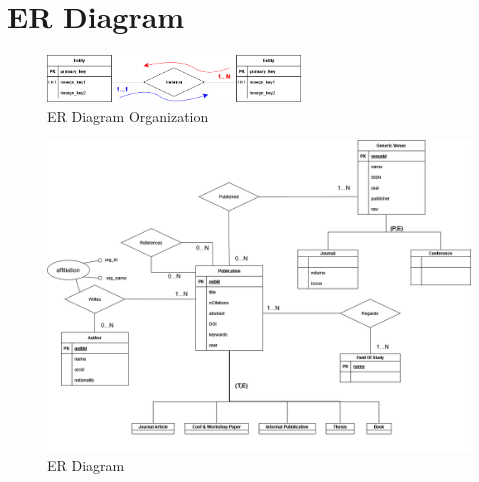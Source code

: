 \documentclass{Configuration_Files/PoliMi3i_thesis}
\begin{document}
\chapter{ER Diagram}
\begin{figure}[H]
    \centering
    \includegraphics[width=0.6\textwidth]{legendaER.png}
    \caption{ER Diagram Organization}
    \label{fig:erleg}
\end{figure}
\bigskip
\begin{figure}[H]
    \centering
    \includegraphics[width=1\textwidth]{ER.png}
    \caption{ER Diagram}
    \label{fig:er}
\end{figure}
\end{document}
